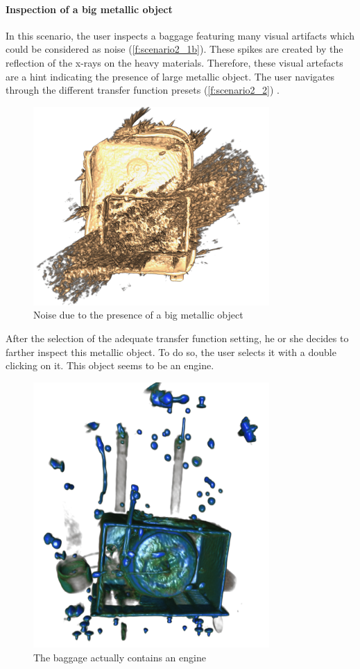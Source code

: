 \paragraph{Inspection of a big metallic object}

In this scenario, the user inspects a baggage featuring many visual artifacts which could be considered as noise (\autoref{f:scenario2_1b}). These spikes are created by the reflection of the x-rays on the heavy materials. Therefore, these visual artefacts are a hint indicating the presence of large metallic object. The user navigates through the different transfer function presets (\autoref{f:scenario2_2}) .
 
\begin{figure}
\centering
\includegraphics[width=9cm]{Figures/scenario2_1.PNG}
\caption{ Noise due to the presence of a big metallic object }
\label{f:scenario2_1b}
\end{figure}
After the selection of the adequate transfer function setting, he or she decides to farther inspect this metallic object. To do so, the user selects it with a double clicking on it. This object seems to be an engine.
\begin{figure}
\centering
\includegraphics[width=9cm]{Figures/scenario2_2.PNG}
\caption{ The baggage actually contains  an engine }
\label{f:scenario2_2}
\end{figure}

